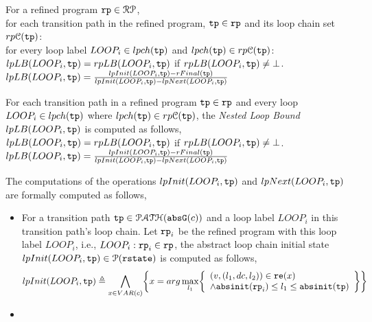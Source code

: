 \begin{enumerate}
\begin{enumerate}
For a refined program $\mathtt{rp} \in \mathcal{RP}$, 
\\
for each transition path in the refined program, $\mathtt{tp} \in \mathtt{rp}$ and its loop chain set $rp\mathcal{C}(\mathtt{tp})$:
\\
for every loop label $LOOP_i \in lpch(\mathtt{tp}) $ and $lpch(\mathtt{tp})  \in rp\mathcal{C}(\mathtt{tp})$:
\\
$lpLB(LOOP_i, \mathtt{tp}) = rpLB(LOOP_i, \mathtt{tp})$ if $rpLB(LOOP_i, \mathtt{tp}) \neq \bot$.
\\
$lpLB(LOOP_i, \mathtt{tp}) = 
\frac{lpInit(LOOP_i, \mathtt{tp}) - rFinal(\mathtt{tp})}{lpInit(LOOP_i, \mathtt{tp}) - lpNext(LOOP_i, \mathtt{tp})}$
\begin{defn}
  \label{def:nested_loop_bound}
For each transition path in a refined program $\mathtt{tp} \in \mathtt{rp}$ and every loop $LOOP_i \in lpch(\mathtt{tp})$ where $lpch(\mathtt{tp})  \in rp\mathcal{C}(\mathtt{tp})$, 
the \emph{Nested Loop Bound} $lpLB(LOOP_i, \mathtt{tp})$ is computed as follows,
\\
$lpLB(LOOP_i, \mathtt{tp}) = rpLB(LOOP_i, \mathtt{tp})$ if $rpLB(LOOP_i, \mathtt{tp}) \neq \bot$.
\\
$lpLB(LOOP_i, \mathtt{tp}) = 
\frac{lpInit(LOOP_i, \mathtt{tp}) - rFinal(\mathtt{tp})}{lpInit(LOOP_i, \mathtt{tp}) - lpNext(LOOP_i, \mathtt{tp})}$
\end{defn}
The computations of the operations $lpInit(LOOP_i, \mathtt{tp})$ and $lpNext(LOOP_i, \mathtt{tp})$
are formally computed as follows,
\begin{itemize}
\item For a transition path $\mathtt{tp} \in \mathcal{PATH}(\mathtt{abs}{\mathtt{G}}(c))$ and a loop label $LOOP_i$ in this transition path's loop chain.
Let $\mathtt{rp}_i$ be the refined program with this loop label $LOOP_i$, i.e., $LOOP_i: \mathtt{rp}_i \in \mathtt{rp}$, 
the abstract loop chain initial state $lpInit(LOOP_i, \mathtt{tp}) \in \mathcal{P}(\mathtt{rstate})$ is computed as follows,
\[
  lpInit(LOOP_i, \tpath) \triangleq 
  \bigwedge_{x \in VAR(c)}
  \left\{ 
  x = arg\max_{l_1}
  \left\{
      \begin{array}{l}
    (v, (l_1, dc, l_2)) \in \reset(x) 
        \\ 
    \land \absinit(\rprog_i) \leq l_1 \leq \absinit(\tpath)
    \end{array}
    \right\}
  \right\}
  \]
\item

\end{itemize}
\end{enumerate}
\end{enumerate}
